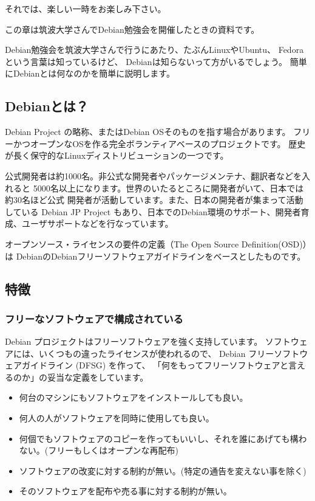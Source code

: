 \documentclass[mingoth,a4paper]{jsarticle}
\begin{document}
 それでは、楽しい一時をお楽しみ下さい。


この章は筑波大学さんでDebian勉強会を開催したときの資料です。

Debian勉強会を筑波大学さんで行うにあたり、たぶんLinuxやUbuntu、
Fedoraという言葉は知っているけど、
Debianは知らないって方がいるでしょう。
簡単にDebianとは何なのかを簡単に説明します。

\subsection{Debianとは？}

Debian Project の略称、またはDebian OSそのものを指す場合があります。
フリーかつオープンなOSを作る完全ボランティアベースのプロジェクトです。
歴史が長く保守的なLinuxディストリビューションの一つです。

公式開発者は約1000名。非公式な開発者やパッケージメンテナ、翻訳者などを入れると
5000名以上になります。世界のいたるところに開発者がいて、日本では約30名ほど公式
開発者が活動しています。また、日本の開発者が集まって活動している Debian JP Project
もあり、日本でのDebian環境のサポート、開発者育成、ユーザサポートなどを行なっています。

オープンソース・ライセンスの要件の定義（The Open Source Definition(OSD)）は
DebianのDebianフリーソフトウェアガイドラインをベースとしたものです。

\subsection{特徴}

\subsubsection{フリーなソフトウェアで構成されている}
Debian プロジェクトはフリーソフトウェアを強く支持しています。
ソフトウェアには、いくつもの違ったライセンスが使われるので、
Debian フリーソフトウェアガイドライン (DFSG) を作って、
「何をもってフリーソフトウェアと言えるのか」の妥当な定義をしています。

\begin{itemize}
\item 何台のマシンにもソフトウェアをインストールしても良い。
\item 何人の人がソフトウェアを同時に使用しても良い。
\item 何個でもソフトウェアのコピーを作ってもいいし、それを誰にあげても構わない。(フリーもしくはオープンな再配布)
\item ソフトウェアの改変に対する制約が無い。(特定の通告を変えない事を除く)
\item そのソフトウェアを配布や売る事に対する制約が無い。
\end{itemize}
\end{document}
